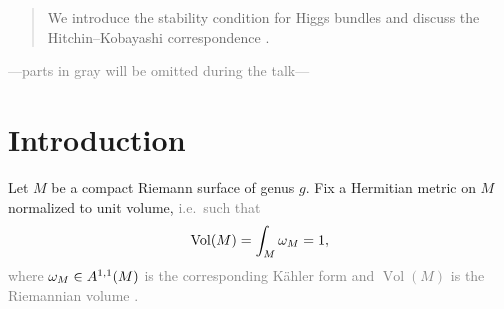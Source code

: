 \documentclass[A4paper, 12pt, british, reqno]{amsart}
\newcommand{\1}{\mathbbm{1}}
\begin{document}
\maketitle

\begin{abstract}
    We introduce the stability condition for Higgs bundles and discuss the Hitchin--Kobayashi correspondence \cite[\S 3 and \S 4]{hit87a}.
\end{abstract}

\tableofcontents

\begin{center}
\textcolor{gray}{---parts in gray will be omitted during the talk---}
\end{center}

\section{Introduction}

Let $M$ be a compact Riemann surface of genus $g$.
Fix a Hermitian metric on $M$ normalized to unit volume, \textcolor{gray}{i.e.~such that
\[ \operatorname{Vol}(M)=\int_{M}\omega_{M}=1, \]
where $\omega_{M}\in A^{1,1}(M)$ is the corresponding Kähler form \cite[Beginning of \S 3.3]{voi02} and $\operatorname{Vol}(M)$ is the Riemannian volume \cite[Lemma 3.8]{voi02}.}
\end{document}
